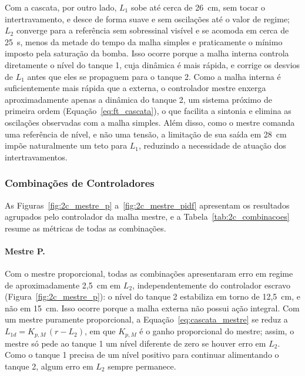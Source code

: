 \documentclass[a4paper,12pt]{article}
\begin{document}
\begin{justify}
    \hspace{4ex}Com a cascata, por outro lado, $L_1$ sobe até cerca de 26~cm, sem tocar o intertravamento, e desce de forma suave e sem oscilações até o valor de regime; $L_2$ converge para a referência sem sobressinal visível e se acomoda em cerca de 25~s, menos da metade do tempo da malha simples e praticamente o mínimo imposto pela saturação da bomba. Isso ocorre porque a malha interna controla diretamente o nível do tanque 1, cuja dinâmica é mais rápida, e corrige os desvios de $L_1$ antes que eles se propaguem para o tanque 2. Como a malha interna é suficientemente mais rápida que a externa, o controlador mestre enxerga aproximadamente apenas a dinâmica do tanque 2, um sistema próximo de primeira ordem (Equação~\eqref{eq:ft_cascata}), o que facilita a sintonia e elimina as oscilações observadas com a malha simples. Além disso, como o mestre comanda uma referência de nível, e não uma tensão, a limitação de sua saída em 28~cm impõe naturalmente um teto para $L_1$, reduzindo a necessidade de atuação dos intertravamentos.
\end{justify}

\subsubsection{Combinações de Controladores}

\begin{justify}
    \hspace{4ex}As Figuras~\ref{fig:2c_mestre_p} a~\ref{fig:2c_mestre_pidf} apresentam os resultados agrupados pelo controlador da malha mestre, e a Tabela~\ref{tab:2c_combinacoes} resume as métricas de todas as combinações.
\end{justify}

\paragraph{Mestre P.}

\begin{justify}
    \hspace{4ex}Com o mestre proporcional, todas as combinações apresentaram erro em regime de aproximadamente 2,5~cm em $L_2$, independentemente do controlador escravo (Figura~\ref{fig:2c_mestre_p}): o nível do tanque 2 estabiliza em torno de 12,5~cm, e não em 15~cm. Isso ocorre porque a malha externa não possui ação integral. Com um mestre puramente proporcional, a Equação~\eqref{eq:cascata_mestre} se reduz a $L_{1d} = K_{p,M}\,(r - L_2)$, em que $K_{p,M}$ é o ganho proporcional do mestre; assim, o mestre só pede ao tanque 1 um nível diferente de zero se houver erro em $L_2$. Como o tanque 1 precisa de um nível positivo para continuar alimentando o tanque 2, algum erro em $L_2$ sempre permanece.
\end{justify}
\end{document}
